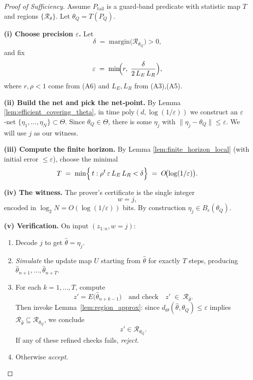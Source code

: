 \documentclass[12pt]{article}
\theoremstyle{definition}
\theoremstyle{plain}
\begin{document}
\begin{proof}[Proof of Sufficiency]
Assume \(P_{\mathrm{tail}}\) is a guard‑band predicate with statistic map \(T\) and regions \(\{\mathcal R_\theta\}\).  Let \(\theta_Q=T(P_Q)\).

\medskip\noindent
\textbf{(i) Choose precision \(\varepsilon\).}
Let 
\[
\delta \;=\;\text{margin}\bigl(\mathcal R_{\theta_Q}\bigr)>0,
\]
and fix 
\[
\varepsilon \;=\;\min\!\Bigl(r,\;\frac{\delta}{2\,L_E\,L_R}\Bigr),
\]
where \(r,\rho<1\) come from (A6) and \(L_E,L_R\) from (A3),(A5).

\medskip\noindent
\textbf{(ii) Build the net and pick the net‐point.}  
By Lemma \ref{lem:efficient_covering_theta}, in time \(\mathrm{poly}(d,\log(\!1/\varepsilon))\) we construct an \(\varepsilon\)‑net
\(\{\eta_1,\dots,\eta_N\}\subset\Theta\).  Since \(\theta_Q\in\Theta\), there is some \(\eta_j\) with
\(\|\eta_j-\theta_Q\|\le\varepsilon\).  We will use \(j\) as our witness.

\medskip\noindent
\textbf{(iii) Compute the finite horizon.}  
By Lemma \ref{lem:finite_horizon_local} (with initial error \(\le\varepsilon\)), choose the minimal
\[
T \;=\;
\min\Bigl\{\,t : \rho^t\,\varepsilon\,L_E\,L_R < \delta\Bigr\}
\;=\;
O\!\bigl(\log(1/\varepsilon)\bigr).
\]

\medskip\noindent
\textbf{(iv) The witness.}  
The prover’s certificate is the single integer
\[
w = j,
\]
encoded in \(\log_2 N = O(\log(1/\varepsilon))\) bits.  By construction \(\eta_j\in B_r(\theta_Q)\).

\medskip\noindent
\textbf{(v) Verification.}  On input \((z_{1:n},w=j)\):
\begin{enumerate}
  \item Decode \(j\) to get \(\widehat\theta=\eta_j.\)
  \item \emph{Simulate} the update map \(U\) starting from \(\widehat\theta\) for exactly \(T\) steps, producing
    \(\widehat\theta_{n+1},\dots,\widehat\theta_{n+T}.\)
\item For each $k=1,\dots,T$, compute
\[
  z' = E\bigl(\widehat\theta_{n+k-1}\bigr)
  \quad\text{and check}\quad
  z' \;\in\;\mathcal R_{\widehat\theta}.
\]
Then invoke Lemma~\ref{lem:region_approx}: since 
$d_\Theta(\widehat\theta,\theta_Q)\le\varepsilon$ implies 
\(\mathcal R_{\widehat\theta}\subseteq\mathcal R_{\theta_Q}\), we conclude 
\[
  z'\in\mathcal R_{\theta_Q}.
\]
If any of these refined checks fails, \emph{reject}.

  \item Otherwise \emph{accept}.



\end{enumerate}
\end{proof}
\end{document}
